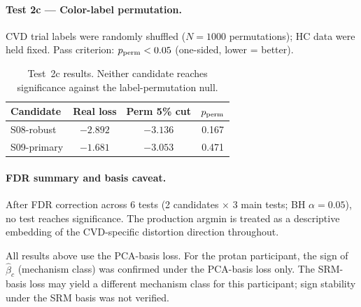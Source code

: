 \paragraph{Test 2c — Color-label permutation.}

CVD trial labels were randomly shuffled ($N = 1000$ permutations);
HC data were held fixed.
Pass criterion: $p_{\rm perm} < 0.05$ (one-sided, lower = better).

\begin{table}[h]
\centering
\begin{tabular}{lccc}
\hline
Candidate & Real loss & Perm 5\% cut & $p_{\rm perm}$ \\
\hline
S08-robust  & $-2.892$ & $-3.136$ & 0.167 \\
S09-primary & $-1.681$ & $-3.053$ & 0.471 \\
\hline
\end{tabular}
\caption{Test~2c results. Neither candidate reaches significance
against the label-permutation null.}
\end{table}

\paragraph{FDR summary and basis caveat.}

After FDR correction across 6 tests (2 candidates $\times$ 3 main
tests; BH $\alpha = 0.05$), no test reaches significance.
The production argmin is treated as a descriptive embedding of the
CVD-specific distortion direction throughout.

All results above use the PCA-basis loss.
For the protan participant, the sign of $\hat\beta_c$ (mechanism class) was confirmed
under the PCA-basis loss only.
The SRM-basis loss may yield a different mechanism class for this
participant; sign stability under the SRM basis was not verified.
